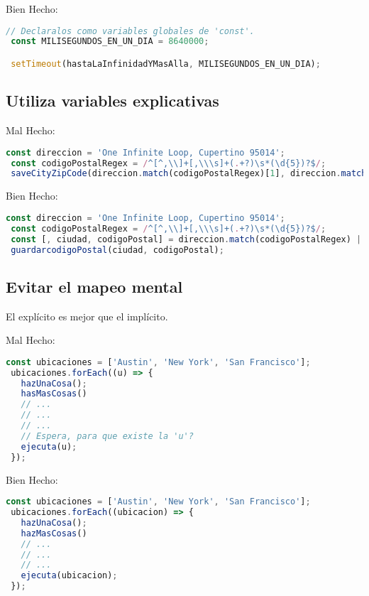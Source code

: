 Bien Hecho:
\begin{lstlisting}[language=TypeScript, style=goodstyle]
 // Declaralos como variables globales de 'const'.
 const MILISEGUNDOS_EN_UN_DIA = 8640000;

 setTimeout(hastaLaInfinidadYMasAlla, MILISEGUNDOS_EN_UN_DIA);
\end{lstlisting}

\newpage

\subsection*{Utiliza variables explicativas}

Mal Hecho:
\begin{lstlisting}[language=TypeScript, style=badstyle]
 const direccion = 'One Infinite Loop, Cupertino 95014';
 const codigoPostalRegex = /^[^,\\]+[,\\\s]+(.+?)\s*(\d{5})?$/;
 saveCityZipCode(direccion.match(codigoPostalRegex)[1], direccion.match(codigoPostalRegex)[2]);
\end{lstlisting}
\vspace{0.5cm} %

Bien Hecho:
\begin{lstlisting}[language=TypeScript, style=goodstyle]
 const direccion = 'One Infinite Loop, Cupertino 95014';
 const codigoPostalRegex = /^[^,\\]+[,\\\s]+(.+?)\s*(\d{5})?$/;
 const [, ciudad, codigoPostal] = direccion.match(codigoPostalRegex) || [];
 guardarcodigoPostal(ciudad, codigoPostal);
\end{lstlisting}

\subsection*{Evitar el mapeo mental}

El explícito es mejor que el implícito.

Mal Hecho:
\begin{lstlisting}[language=TypeScript, style=badstyle]
 const ubicaciones = ['Austin', 'New York', 'San Francisco'];
 ubicaciones.forEach((u) => {
   hazUnaCosa();
   hasMasCosas()
   // ...
   // ...
   // ...
   // Espera, para que existe la 'u'?
   ejecuta(u);
 });
\end{lstlisting}
\vspace{0.5cm} %

Bien Hecho:
\begin{lstlisting}[language=TypeScript, style=goodstyle]
 const ubicaciones = ['Austin', 'New York', 'San Francisco'];
 ubicaciones.forEach((ubicacion) => {
   hazUnaCosa();
   hazMasCosas()
   // ...
   // ...
   // ...
   ejecuta(ubicacion);
 });
\end{lstlisting}

